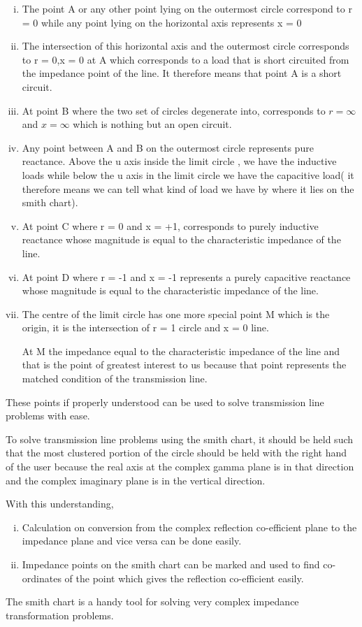 \begin{enumerate}[(i)]
\item The point A or any other point lying on the outermost circle correspond to r = 0 while any point lying on the horizontal axis represents x = 0
\item The intersection of this horizontal axis and the outermost circle corresponds to r = 0,x = 0 at A which corresponds to a load that is short circuited from the impedance point of the line. It therefore means that point A is a short circuit.
\item At point B where the two set of circles degenerate into, corresponds to $r=\infty$ and $x=\infty$ which is nothing but an open circuit.\item Any point between A and B on the outermost circle represents pure reactance. Above the u axis inside the limit circle , we have the inductive loads while below the u axis in the limit circle we have the capacitive load( it therefore means we can tell what kind of load we have by where it lies on the smith chart).
\item At point C where r = 0 and x = +1, corresponds to purely inductive reactance whose magnitude is equal to the characteristic impedance of the line.
\item At point D where r = -1 and x = -1 represents a purely capacitive reactance whose magnitude is equal to the characteristic impedance of the line.
\item The centre of the limit circle has one more special point M which is the origin, it is the intersection of r = 1 circle and x = 0 line.

At M the impedance equal to the characteristic impedance of the line and that is the point of greatest interest to us because that point represents the matched condition of the transmission line.
\end{enumerate}
These points if properly understood can be used to solve transmission line problems with ease.

To solve transmission line problems using the smith chart, it should be held such that the most clustered portion of the circle should be held with the right hand of the user because the real axis at the complex gamma plane is in that direction and the complex imaginary plane is in the vertical direction.

With this understanding,
\begin{enumerate}[(i)]
\item Calculation on conversion from the complex reflection co-efficient plane to the impedance plane and vice versa can be done easily.
\item Impedance points on the smith chart can be marked and used to find co-ordinates of the point which gives the reflection co-efficient easily.
\end{enumerate}
The smith chart is a handy tool for solving very complex impedance transformation problems.
